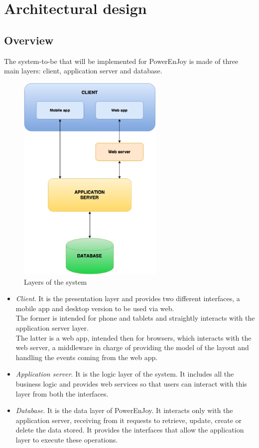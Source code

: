 \chapter{Architectural design}

\section{Overview}
The system-to-be that will be implemented for PowerEnJoy is made of three main layers: client, application server and database.

\begin{figure}[h]
	\centering
	\includegraphics[width=7cm,keepaspectratio]{figures/layers.eps}
	\caption{Layers of the system}
	\label{fig:layers}
\end{figure}

\begin{itemize}
	\item \emph{Client}. It is the presentation layer and provides two different interfaces, a mobile app and desktop version to be used via web. \\ The former is intended for phone and tablets and straightly interacts with the application server layer. \\ The latter is a web app, intended then for browsers, which interacts with the web server, a middleware in charge of providing the model of the layout and handling the events coming from the web app.
	
	\item \emph{Application server}. It is the logic layer of the system. It includes all the business logic and provides web services so that users can interact with this layer from both the interfaces.
	
	\item \emph{Database}. It is the data layer of PowerEnJoy. It interacts only with the application server, receiving from it requests to retrieve, update, create or delete the data stored. It provides the interfaces that allow the application layer to execute these operations. 
\end{itemize}

